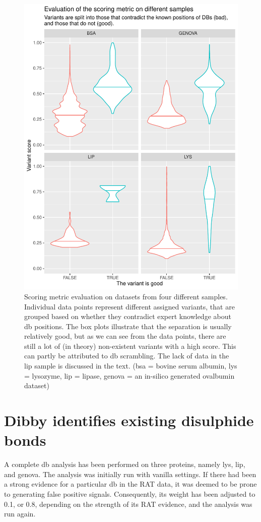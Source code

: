 \begin{figure}
  \centering
  \includegraphics[width=0.85\linewidth]{img/scoring-metric-evaluation.pdf}
  \caption{Scoring metric evaluation on datasets from four different samples. Individual data points represent different assigned variants, that are grouped based on whether they contradict expert knowledge about \gls*{db} positions. The box plots illustrate that the separation is usually relatively good, but as we can see from the data points, there are still a lot of (in theory) non-existent variants with a high score. This can partly be attributed to \gls*{db} scrambling. The lack of data in the \gls*{lip} sample is discussed in the text. (\gls*{bsa} = bovine serum albumin, \gls*{lys} = lysozyme, \gls*{lip} = lipase, \gls*{genova} = an in-silico generated ovalbumin dataset)}\label{fig:scoring-metric}
\end{figure}

\section{Dibby identifies existing disulphide bonds}

A complete \gls*{db} analysis has been performed on three proteins, namely \gls*{lys}, \gls*{lip}, and \gls*{genova}\@. The analysis was initially run with vanilla settings. If there had been a strong evidence for a particular \gls*{db} in the RAT data, it was deemed to be prone to generating false positive signals. Consequently, its weight has been adjusted to 0.1, or 0.8, depending on the strength of its RAT evidence, and the analysis was run again.

